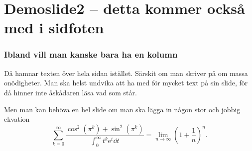 \documentclass{beamer}
\begin{document}
\section{Demoslide2 -- detta kommer också med i sidfoten}
\begin{frame}
\frametitle{Ibland vill man kanske bara ha en kolumn}
Då hamnar texten över hela sidan istället. Särskit om man skriver på om massa onödigheter. Man ska helst undvika att ha med för mycket text på sin slide, för då hinner inte åskådaren läsa vad som står.

Men man kan behöva en hel slide om man ska lägga in någon stor och jobbig ekvation
\[
\sum_{k=0}^\infty \frac{\cos^2(\pi^k)+\sin^2(\pi^k)}{\int_0^\infty t^k\mathrm{e}^t \dd{t} } 
= \lim_{n\to\infty}\left(1+\frac{1}{n}\right)^n. 
\]

\end{frame}
\end{document}
